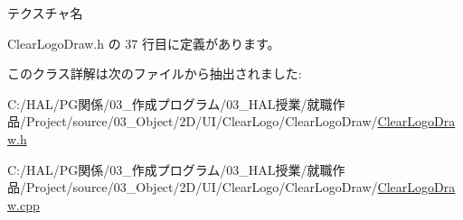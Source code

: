 テクスチャ名 



 Clear\+Logo\+Draw.\+h の 37 行目に定義があります。



このクラス詳解は次のファイルから抽出されました\+:\begin{DoxyCompactItemize}
\item 
C\+:/\+H\+A\+L/\+P\+G関係/03\+\_\+作成プログラム/03\+\_\+\+H\+A\+L授業/就職作品/\+Project/source/03\+\_\+\+Object/2\+D/\+U\+I/\+Clear\+Logo/\+Clear\+Logo\+Draw/\mbox{\hyperlink{_clear_logo_draw_8h}{Clear\+Logo\+Draw.\+h}}\item 
C\+:/\+H\+A\+L/\+P\+G関係/03\+\_\+作成プログラム/03\+\_\+\+H\+A\+L授業/就職作品/\+Project/source/03\+\_\+\+Object/2\+D/\+U\+I/\+Clear\+Logo/\+Clear\+Logo\+Draw/\mbox{\hyperlink{_clear_logo_draw_8cpp}{Clear\+Logo\+Draw.\+cpp}}\end{DoxyCompactItemize}
